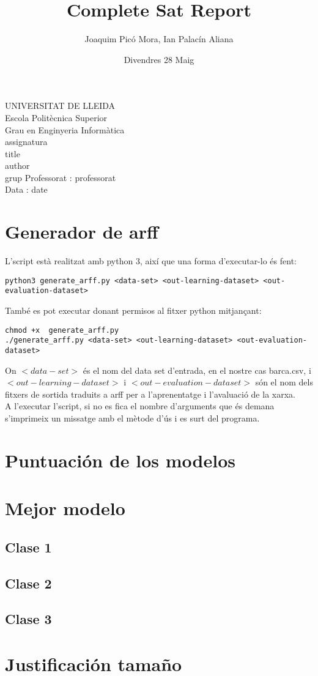 \documentclass{article}
\title{Complete Sat Report}
\author{Joaquim Picó Mora, Ian Palacín Aliana}
\date{Divendres 28 Maig}
\renewcommand{\maketitle}{ %
	\begin{titlepage}
		\raggedright{UNIVERSITAT DE LLEIDA \\
			Escola Politècnica Superior \\
			Grau en Enginyeria Informàtica\\
			\1assignatura\\}
		\vspace{5cm}
		\centering\huge{\5title \\}
		\vspace{3cm}
		\large{\6author} \\
		\normalsize{\3grup}
		\vfill
		Professorat : \4professorat \\
		Data : \7date
\end{titlepage}}
\begin{document}
	\maketitle
	\thispagestyle{empty}


\section{Generador de arff}	
L'script està realitzat amb python 3, així que una forma d'executar-lo és fent:
\begin{verbatim}
python3 generate_arff.py <data-set> <out-learning-dataset> <out-evaluation-dataset>
\end{verbatim}
També es pot executar donant permisos al fitxer python mitjançant:
\begin{verbatim}
chmod +x  generate_arff.py
./generate_arff.py <data-set> <out-learning-dataset> <out-evaluation-dataset>
\end{verbatim}
On $<data-set>$ és el nom del data set d'entrada, en el nostre cas barca.csv, i $<out-learning-dataset>$ i $<out-evaluation-dataset>$ són el nom dels fitxers de sortida traduits a arff per a l'aprenentatge i l'avaluació de la xarxa.\\
A l'executar l'script, si no es fica el nombre d'arguments que és demana s'imprimeix un missatge amb el mètode d'ús i es surt del programa. 
\section{Puntuación de los modelos}

\section{Mejor modelo}
\subsection{Clase 1}
\subsection{Clase 2}
\subsection{Clase 3}

\section{Justificación tamaño}
\end{document}
